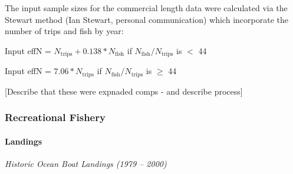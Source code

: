 \documentclass[11pt,
  english,
  a4paper,
]{article}
\begin{document}
\leavevmode\tagmcend\tagstructend\par


The input sample sizes for the commercial length data were calculated via the Stewart method (Ian Stewart, personal communication) which incorporate the number of trips and fish by year:

\leavevmode\tagmcend\tagstructend\par

\begin{centering}

Input effN = $N_{\text{trips}} + 0.138 * N_{\text{fish}}$ if $N_{\text{fish}}/N_{\text{trips}}$ is $<$ 44

Input effN = $7.06 * N_{\text{trips}}$ if $N_{\text{fish}}/N_{\text{trips}}$ is $\geq$ 44

\end{centering}


{[}Describe that these were expnaded comps - and describe process{]}

\leavevmode\tagmcend\tagstructend\par


\hypertarget{recreational-fishery}{%
\subsubsection{Recreational Fishery}\label{recreational-fishery}}

\leavevmode\tagmcend\tagstructend


\hypertarget{landings-1}{%
\paragraph{Landings}\label{landings-1}}

\leavevmode\tagmcend\tagstructend


\emph{Historic Ocean Boat Landings (1979 -- 2000)}

\leavevmode\tagmcend\tagstructend\par

\end{document}
